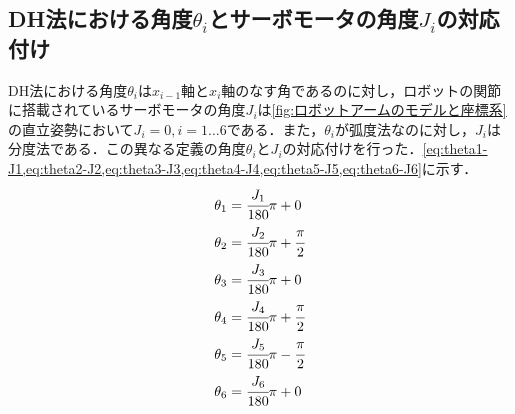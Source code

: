 \documentclass{ltjsarticle}
\begin{document}
\subsection{DH法における角度$\theta_i$とサーボモータの角度$J_i$の対応付け}
DH法における角度$\theta_i$は$x_{i-1}$軸と$x_i$軸のなす角であるのに対し，ロボットの関節に搭載されているサーボモータの角度$J_i$は\cref{fig:ロボットアームのモデルと座標系}の直立姿勢において$J_i = 0, i = 1 \dots 6$である．また，$\theta_i$が弧度法なのに対し，$J_i$は分度法である．この異なる定義の角度$\theta_i$と$J_i$の対応付けを行った．\cref{eq:theta1-J1,eq:theta2-J2,eq:theta3-J3,eq:theta4-J4,eq:theta5-J5,eq:theta6-J6}に示す．
\begin{align}
	\label{eq:theta1-J1}
	\theta_1 &= \cfrac{J_1}{180} \pi + 0 \\
	\label{eq:theta2-J2}
	\theta_2 &= \cfrac{J_2}{180} \pi + \cfrac{\pi}{2} \\
	\label{eq:theta3-J3}
	\theta_3 &= \cfrac{J_3}{180} \pi + 0 \\
	\label{eq:theta4-J4}
	\theta_4 &= \cfrac{J_4}{180} \pi + \cfrac{\pi}{2} \\
	\label{eq:theta5-J5}
	\theta_5 &= \cfrac{J_5}{180} \pi - \cfrac{\pi}{2} \\
	\label{eq:theta6-J6}
	\theta_6 &= \cfrac{J_6}{180} \pi + 0
\end{align}
\end{document}
